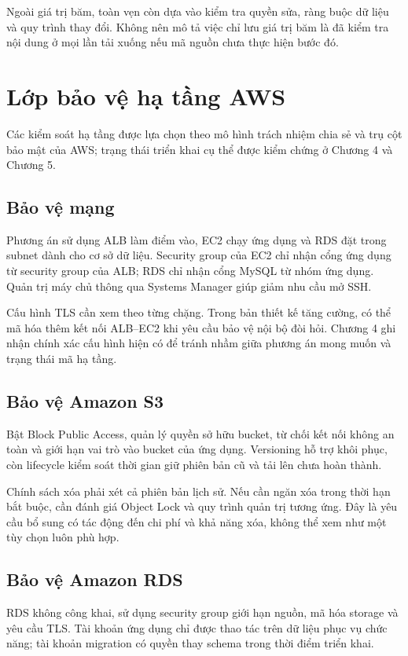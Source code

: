 Ngoài giá trị băm, toàn vẹn còn dựa vào kiểm tra quyền sửa, ràng buộc dữ liệu và quy trình thay đổi. Không nên mô tả việc chỉ lưu giá trị băm là đã kiểm tra nội dung ở mọi lần tải xuống nếu mã nguồn chưa thực hiện bước đó.

\section{Lớp bảo vệ hạ tầng AWS}
Các kiểm soát hạ tầng được lựa chọn theo mô hình trách nhiệm chia sẻ và trụ cột bảo mật của AWS; trạng thái triển khai cụ thể được kiểm chứng ở Chương 4 và Chương 5.\cite{shared,pillar}
\subsection{Bảo vệ mạng}
Phương án sử dụng ALB làm điểm vào, EC2 chạy ứng dụng và RDS đặt trong subnet dành cho cơ sở dữ liệu. Security group của EC2 chỉ nhận cổng ứng dụng từ security group của ALB; RDS chỉ nhận cổng MySQL từ nhóm ứng dụng. Quản trị máy chủ thông qua Systems Manager giúp giảm nhu cầu mở SSH.

Cấu hình TLS cần xem theo từng chặng. Trong bản thiết kế tăng cường, có thể mã hóa thêm kết nối ALB--EC2 khi yêu cầu bảo vệ nội bộ đòi hỏi. Chương 4 ghi nhận chính xác cấu hình hiện có để tránh nhầm giữa phương án mong muốn và trạng thái mã hạ tầng.
\subsection{Bảo vệ Amazon S3}
Bật Block Public Access, quản lý quyền sở hữu bucket, từ chối kết nối không an toàn và giới hạn vai trò vào bucket của ứng dụng. Versioning hỗ trợ khôi phục, còn lifecycle kiểm soát thời gian giữ phiên bản cũ và tải lên chưa hoàn thành.

Chính sách xóa phải xét cả phiên bản lịch sử. Nếu cần ngăn xóa trong thời hạn bắt buộc, cần đánh giá Object Lock và quy trình quản trị tương ứng. Đây là yêu cầu bổ sung có tác động đến chi phí và khả năng xóa, không thể xem như một tùy chọn luôn phù hợp.
\subsection{Bảo vệ Amazon RDS}
RDS không công khai, sử dụng security group giới hạn nguồn, mã hóa storage và yêu cầu TLS. Tài khoản ứng dụng chỉ được thao tác trên dữ liệu phục vụ chức năng; tài khoản migration có quyền thay schema trong thời điểm triển khai.

